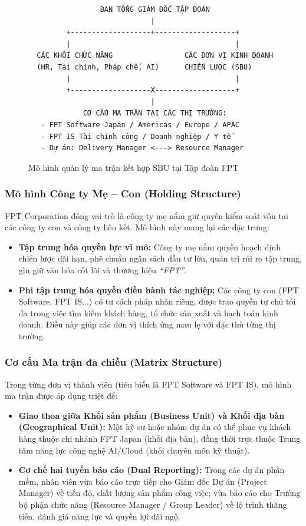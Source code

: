 \begin{figure}[htbp]
\centering
\begin{verbatim}
                 BAN TỔNG GIÁM ĐỐC TẬP ĐOÀN
                             |
         +-------------------+-------------------+
         |                                       |
  CÁC KHỐI CHỨC NĂNG                 CÁC ĐƠN VỊ KINH DOANH
  (HR, Tài chính, Pháp chế, AI)      CHIẾN LƯỢC (SBU)
         |                                       |
         +-------------------X-------------------+
                             |
             CƠ CẤU MA TRẬN TẠI CÁC THỊ TRƯỜNG:
   - FPT Software Japan / Americas / Europe / APAC
   - FPT IS Tài chính công / Doanh nghiệp / Y tế
   - Dự án: Delivery Manager <---> Resource Manager
\end{verbatim}
\caption{Mô hình quản lý ma trận kết hợp SBU tại Tập đoàn FPT}
\label{fig:mo_hinh_quan_ly}
\end{figure}

\subsubsection{Mô hình Công ty Mẹ -- Con (Holding Structure)}
FPT Corporation đóng vai trò là công ty mẹ nắm giữ quyền kiểm soát vốn tại các công ty con và công ty liên kết. Mô hình này mang lại các đặc trưng:
\begin{itemize}
    \item \textbf{Tập trung hóa quyền lực vĩ mô:} Công ty mẹ nắm quyền hoạch định chiến lược dài hạn, phê chuẩn ngân sách đầu tư lớn, quản trị rủi ro tập trung, gìn giữ văn hóa cốt lõi và thương hiệu \textit{``FPT''}.
    \item \textbf{Phi tập trung hóa quyền điều hành tác nghiệp:} Các công ty con (FPT Software, FPT IS...) có tư cách pháp nhân riêng, được trao quyền tự chủ tối đa trong việc tìm kiếm khách hàng, tổ chức sản xuất và hạch toán kinh doanh. Điều này giúp các đơn vị thích ứng mau lẹ với đặc thù từng thị trường.
\end{itemize}

\subsubsection{Cơ cấu Ma trận đa chiều (Matrix Structure)}
Trong từng đơn vị thành viên (tiêu biểu là FPT Software và FPT IS), mô hình ma trận được áp dụng triệt để:
\begin{itemize}
    \item \textbf{Giao thoa giữa Khối sản phẩm (Business Unit) và Khối địa bàn (Geographical Unit):} Một kỹ sư hoặc nhóm dự án có thể phục vụ khách hàng thuộc chi nhánh FPT Japan (khối địa bàn), đồng thời trực thuộc Trung tâm năng lực công nghệ AI/Cloud (khối chuyên môn kỹ thuật).
    \item \textbf{Cơ chế hai tuyến báo cáo (Dual Reporting):} Trong các dự án phần mềm, nhân viên vừa báo cáo trực tiếp cho Giám đốc Dự án (Project Manager) về tiến độ, chất lượng sản phẩm công việc; vừa báo cáo cho Trưởng bộ phận chức năng (Resource Manager / Group Leader) về lộ trình thăng tiến, đánh giá năng lực và quyền lợi đãi ngộ.
\end{itemize}

